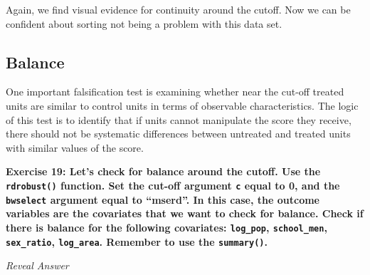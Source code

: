 \documentclass[
  letterpaper,
  DIV=11,
  numbers=noendperiod]{scrreprt}
\newenvironment{Shaded}{\begin{snugshade}}{\end{snugshade}}
\newcommand{\AttributeTok}[1]{\textcolor[rgb]{0.40,0.45,0.13}{#1}}
\newcommand{\DecValTok}[1]{\textcolor[rgb]{0.68,0.00,0.00}{#1}}
\newcommand{\FunctionTok}[1]{\textcolor[rgb]{0.28,0.35,0.67}{#1}}
\newcommand{\NormalTok}[1]{\textcolor[rgb]{0.00,0.23,0.31}{#1}}
\newcommand{\SpecialCharTok}[1]{\textcolor[rgb]{0.37,0.37,0.37}{#1}}
\newcommand{\StringTok}[1]{\textcolor[rgb]{0.13,0.47,0.30}{#1}}
\begin{document}
\hfill\break

Again, we find visual evidence for continuity around the cutoff. Now we
can be confident about sorting not being a problem with this data set.

\hfill\break

\hypertarget{balance}{%
\subsection{Balance}\label{balance}}

One important falsification test is examining whether near the cut-off
treated units are similar to control units in terms of observable
characteristics. The logic of this test is to identify that if units
cannot manipulate the score they receive, there should not be systematic
differences between untreated and treated units with similar values of
the score.

\textbf{Exercise 19: Let's check for balance around the cutoff. Use the
\texttt{rdrobust()} function. Set the cut-off argument \texttt{c} equal
to 0, and the \texttt{bwselect} argument equal to ``mserd''. In this
case, the outcome variables are the covariates that we want to check for
balance. Check if there is balance for the following covariates:
\texttt{log\_pop}, \texttt{school\_men}, \texttt{sex\_ratio},
\texttt{log\_area}. Remember to use the \texttt{summary()}.}

\hfill\break

\emph{Reveal Answer}

\begin{Shaded}
\end{Shaded}
\end{document}
